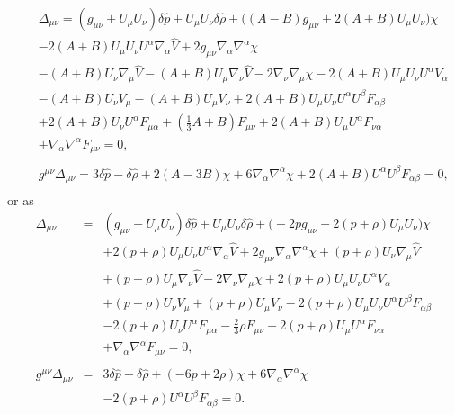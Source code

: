 \begin{eqnarray}
&&\Delta_{\mu\nu}= (g_{\mu \nu } + U_{\mu } U_{\nu }) \delta \hat{p}{} + U_{\mu } U_{\nu } \delta \hat{\rho}{} + \bigl((A -  B) g_{\mu \nu } + 2 (A + B) U_{\mu } U_{\nu }\bigr) \chi \nonumber \\ 
&& - 2 (A + B) U_{\mu } U_{\nu } U^{\alpha } \nabla_{\alpha }\hat{V}{} + 2 g_{\mu \nu } \nabla_{\alpha }\nabla^{\alpha }\chi 
\nonumber\\
&&-  (A + B) U_{\nu } \nabla_{\mu }\hat{V}{} -  (A + B) U_{\mu } \nabla_{\nu }\hat{V}{}  - 2 \nabla_{\nu }\nabla_{\mu }\chi -2 (A + B) U_{\mu } U_{\nu } U^{\alpha } V_{\alpha }
\nonumber\\
&& -  (A + B) U_{\nu } V_{\mu }  -  (A + B) U_{\mu } V_{\nu }+2 (A + B) U_{\mu } U_{\nu } U^{\alpha } U^{\beta } F_{\alpha \beta } 
\nonumber\\
&&+ 2 (A + B) U_{\nu } U^{\alpha } F_{\mu \alpha } + (\tfrac{1}{3} A + B) F_{\mu \nu }  + 2 (A + B) U_{\mu } U^{\alpha } F_{\nu \alpha } 
\nonumber\\
&&+ \nabla_{\alpha }\nabla^{\alpha }F_{\mu \nu }=0,
\nonumber\\ 
\nonumber\\
&&g^{\mu\nu}\Delta_{\mu\nu}= 3 \delta \hat{p}{} -  \delta \hat{\rho}{} + 2 (A - 3 B) \chi + 6 \nabla_{\alpha }\nabla^{\alpha }\chi +2 (A + B) U^{\alpha } U^{\beta } F_{\alpha \beta }=0,
\nonumber\\
\label{12.8}
\end{eqnarray}
%
or as
%
%
\begin{eqnarray}
\Delta_{\mu\nu}&=& (g_{\mu \nu } + U_{\mu } U_{\nu }) \delta \hat{p}{} + U_{\mu } U_{\nu } \delta \hat{\rho}{} + \bigl(-2 p g_{\mu \nu } - 2 (p + \rho) U_{\mu } U_{\nu }\bigr) \chi 
\nonumber\\
&&+ 2 (p + \rho) U_{\mu } U_{\nu } U^{\alpha } \nabla_{\alpha }\hat{V}{}  + 2 g_{\mu \nu } \nabla_{\alpha }\nabla^{\alpha }\chi + (p + \rho) U_{\nu } \nabla_{\mu }\hat{V}{} 
\nonumber\\
&&+ (p + \rho) U_{\mu } \nabla_{\nu }\hat{V}{} - 2 \nabla_{\nu }\nabla_{\mu }\chi +2 (p + \rho) U_{\mu } U_{\nu } U^{\alpha } V_{\alpha } \nonumber \\ 
&& + (p + \rho) U_{\nu } V_{\mu } + (p + \rho) U_{\mu } V_{\nu }-2 (p + \rho) U_{\mu } U_{\nu } U^{\alpha } U^{\beta } F_{\alpha \beta } 
\nonumber\\
&&- 2 (p + \rho) U_{\nu } U^{\alpha } F_{\mu \alpha } -  \tfrac{2}{3} \rho F_{\mu \nu }  - 2 (p + \rho) U_{\mu } U^{\alpha } F_{\nu \alpha }
\nonumber\\
&& + \nabla_{\alpha }\nabla^{\alpha }F_{\mu \nu }=0,
\nonumber\\ 
\nonumber\\
g^{\mu\nu}\Delta_{\mu\nu}&=& 3 \delta \hat{p}{} -  \delta \hat{\rho}{} + (-6 p + 2 \rho) \chi + 6 \nabla_{\alpha }\nabla^{\alpha }\chi 
\nonumber\\
&&-2 (p + \rho) U^{\alpha } U^{\beta } F_{\alpha \beta }=0.
\label{12.9}
\end{eqnarray}
